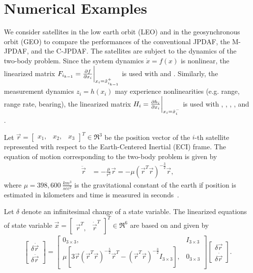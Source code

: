\section{Numerical Examples}
\label{sec:NE}

We consider satellites in the low earth orbit (LEO) and in the geosynchronous orbit (GEO) to compare the performances of the conventional JPDAF, the M-JPDAF, and the C-JPDAF.
The satellites are subject to the dynamics of the two-body problem.
Since the system dynamics $\dot x=f(x)$ is nonlinear, the linearized matrix $F_{i_{k-1}}=\frac{\partial f}{\partial x_i}\bigg|_{x_i=\hat x_{i_{k-1}}^+}$ is used with  and .
Similarly, the measurement dynamics $z_i = h(x_i)$ may experience nonlinearities (e.g. range, range rate, bearing), the linearized matrix $H_i=\frac{\partial h_i}{\partial x_i}\bigg|_{x_i=\hat x_{i}^-}$ is used with , , , , and .

Let $\vec r=\begin{bmatrix}x_1, & x_2, & x_3\end{bmatrix}^T\in\Re^3$ be the position vector of the $i$-th satellite represented with respect to the Earth-Centered Inertial (ECI) frame.
The equation of motion corresponding to the two-body problem is given by
\begin{align}
\label{eqn:NonLin2BP}
\ddot{\vec r}&=-\frac{\mu}{r^3}\vec r=-\mu(\vec r^T\vec r)^{-\frac32}\vec r,
\end{align}
where $\mu=398,600\ \frac{km^3}{sec^2}$ is the gravitational constant of the earth if position is estimated in kilometers and time is measured in seconds~\cite{Val01}.

Let $\delta$ denote an infinitesimal change of a state variable.
The linearized equations of state variable $\vec x=\begin{bmatrix}\vec r^T, & \dot{\vec r}^T\end{bmatrix}^T\in\Re^6$ are based on  and given by
\begin{align}
\begin{bmatrix}
\delta\dot{\vec r} \\ \delta\ddot{\vec r}
\end{bmatrix}
=
\begin{bmatrix}
0_{3\times3}, & I_{3\times3} \\
\mu\left[3\vec r({\vec r}^T\vec r)^{-\frac52}{\vec r}^T-({\vec r}^T\vec r)^{-\frac32}I_{3\times3}\right], & 0_{3\times3}
\end{bmatrix}
\begin{bmatrix}
\delta\vec r \\ \delta\dot{\vec r}
\end{bmatrix}
.
\end{align}

